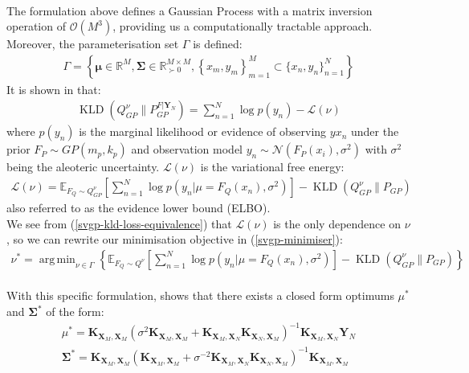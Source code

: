 \documentclass{article}
\newcommand{\KLD}{\operatorname{KLD}}
\DeclareMathOperator*{\argmin}{arg\,min}
\numberwithin{equation}{section}
\begin{document}
\\The formulation above defines a Gaussian Process with a matrix inversion operation of $\mathcal{O}(M^3)$, providing us a computationally tractable approach. Moreover, the parameterisation set $\Gamma$ is defined:
\begin{align}
    \Gamma = \left\{\mathbf{\mu} \in \mathbb{R}^{M}, \mathbf{\Sigma} \in \mathbb{R}^{M\times M}_{\succ 0}, \left\{x_m, y_m\right\}_{m=1}^{M} \subset \{x_n, y_n\}_{n=1}^{N}\right\}
    \label{svgp-parameter-set}
\end{align}
It is shown in \cite{matthews2016sparse} that:
\begin{align}
    \KLD\left(Q_{GP}^{\nu} \Big\| P_{GP}^{F \vert \mathbf{Y}_N} \right) = \sum_{n=1}^N\log p(y_n) - \mathcal{L}(\nu)
    \label{svgp-kld-loss-equivalence}
\end{align}
where $p(y_n)$ is the marginal likelihood or evidence of observing $yx_n$ under the prior $F_P \sim GP(m_p, k_p)$ and observation model $y_n \sim \mathcal{N}(F_P(x_i), \sigma^2)$ with $\sigma^2$ being the aleoteric uncertainty. $\mathcal{L}(\nu)$ is the variational free energy:
\begin{align}
    \mathcal{L}(\nu) = \mathbb{E}_{F_Q \sim Q_{GP}^{\nu}}\left[\sum_{n=1}^{N}\log p\left(y_n \vert \mu=F_Q(x_n), \sigma^2\right)\right] -\KLD\left(Q^{\nu}_{GP}\Big\| P_{GP}\right)
    \label{elbo}
\end{align}
also referred to as the evidence lower bound (ELBO).
\\We see from (\ref{svgp-kld-loss-equivalence}) that $\mathcal{L}(\nu)$ is the only dependence on $\nu$, so we can rewrite our minimisation objective in (\ref{svgp-minimiser}):
\begin{align}
    \nu^* = \argmin_{\nu \in \Gamma} \left\{\mathbb{E}_{F_Q \sim Q^{\nu}}\left[\sum_{n=1}^{N}\log p\left(y_n \vert \mu=F_Q(x_n), \sigma^2\right)\right] -\KLD\left(Q^{\nu}_{GP}\Big\| P_{GP}\right)\right\}
    \label{svgp-minimiser-gvi-kld}
\end{align}
\\With this specific formulation, \cite{titsias2009variational} shows that there exists a closed form optimums $\mu^*$ and $\mathbf{\Sigma}^*$ of the form:
\begin{align}
    \label{svgp-optimal-mean}
    \mu^* = \mathbf{K}_{\mathbf{X}_M, \mathbf{X}_M} \left( \sigma^2 \mathbf{K}_{\mathbf{X}_M, \mathbf{X}_M} + \mathbf{K}_{\mathbf{X}_M, \mathbf{X}_N}\mathbf{K}_{\mathbf{X}_N, \mathbf{X}_M}\right)^{-1}\mathbf{K}_{\mathbf{X}_M, \mathbf{X}_N} \mathbf{Y}_N\\
    \label{svgp-optimal-covariance}
    \mathbf{\Sigma}^* = \mathbf{K}_{\mathbf{X}_M, \mathbf{X}_M} \left(\mathbf{K}_{\mathbf{X}_M, \mathbf{X}_M} +  \sigma^{-2}\mathbf{K}_{\mathbf{X}_M, \mathbf{X}_N}\mathbf{K}_{\mathbf{X}_N, \mathbf{X}_M}\right)^{-1}\mathbf{K}_{\mathbf{X}_M, \mathbf{X}_M}
\end{align}
\end{document}
